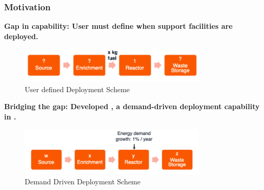   \begin{frame}
    \frametitle{Motivation}

    \textbf{Gap in capability: User must define when support facilities are deployed.} 

    \begin{figure}[htbp!]
      \begin{center}
        \includegraphics[width=0.8\textwidth]{../paper/figures/user-deploy}
      \end{center}
            \caption{User defined Deployment Scheme }
    \end{figure}

    \textbf{Bridging the gap: Developed \deploy, a demand-driven deployment capability in \Cyclus.}

    \begin{figure}[htbp!]
      \begin{center}
        \includegraphics[width=0.8\textwidth]{../paper/figures/auto-deploy}
      \end{center}
            \caption{Demand Driven Deployment Scheme}
    \end{figure}

  \end{frame}
  